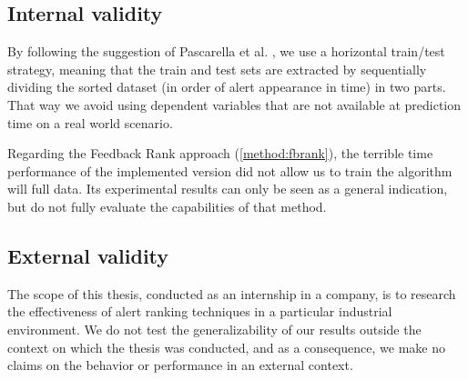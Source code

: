 \subsection{Internal validity}

By following the suggestion of Pascarella et al. \cite{performance_method_bug}, we use a horizontal train/test strategy, meaning that the train and test sets are extracted by sequentially dividing the sorted dataset (in order of alert appearance in time) in two parts. That way we avoid using dependent variables that are not available at prediction time on a real world scenario.

Regarding the Feedback Rank approach (\cref{method:fbrank}), the terrible time performance of the implemented version did not allow us to train the algorithm will full data. Its experimental results can only be seen as a general indication, but do not fully evaluate the capabilities of that method.


\subsection{External validity}
The scope of this thesis, conducted as an internship in a company, is to research the effectiveness of alert ranking techniques in a particular industrial environment. We do not test the generalizability of our results outside the context on which the thesis was conducted, and as a consequence, we make no claims on the behavior or performance in an external context.
